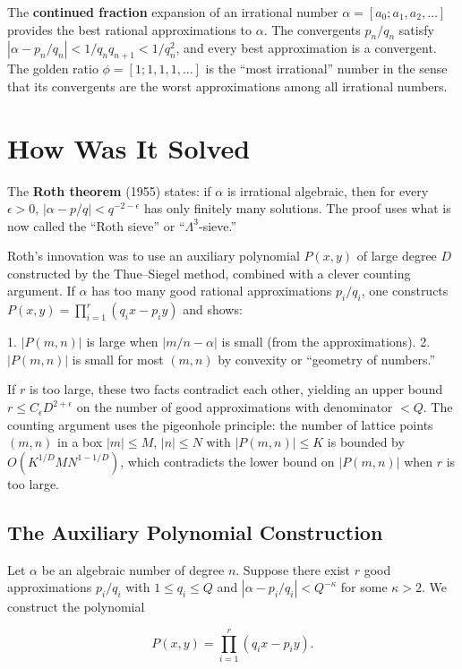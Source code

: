 The \textbf{continued fraction} expansion of an irrational number $\alpha =
[a_0; a_1, a_2, \ldots]$ provides the best rational approximations to $\alpha$.
The convergents $p_n/q_n$ satisfy $|\alpha - p_n/q_n| < 1/q_n q_{n+1} <
1/q_n^2$, and every best approximation is a convergent. The golden ratio
$\phi = [1; 1, 1, 1, \ldots]$ is the ``most irrational'' number in the sense
that its convergents are the worst approximations among all irrational numbers.

\section{How Was It Solved}

The \textbf{Roth theorem} (1955) states: if $\alpha$ is irrational algebraic,
then for every $\epsilon > 0$, $|\alpha - p/q| < q^{-2-\epsilon}$ has only
finitely many solutions. The proof uses what is now called the ``Roth sieve''
or ``$\Lambda^3$-sieve.''

Roth's innovation was to use an auxiliary polynomial $P(x, y)$ of large degree
$D$ constructed by the Thue--Siegel method, combined with a clever counting
argument. If $\alpha$ has too many good rational approximations $p_i/q_i$, one
constructs $P(x,y) = \prod_{i=1}^r (q_i x - p_i y)$ and shows:

1. $|P(m, n)|$ is large when $|m/n - \alpha|$ is small (from the
approximations).
2. $|P(m, n)|$ is small for most $(m,n)$ by convexity or ``geometry of
numbers.''

If $r$ is too large, these two facts contradict each other, yielding an upper
bound $r \leq C_\epsilon D^{2+\epsilon}$ on the number of good approximations
with denominator $< Q$. The counting argument uses the pigeonhole principle:
the number of lattice points $(m,n)$ in a box $|m| \leq M$, $|n| \leq N$ with
$|P(m,n)| \leq K$ is bounded by $O(K^{1/D} MN^{1-1/D})$, which contradicts
the lower bound on $|P(m,n)|$ when $r$ is too large.

\subsection*{The Auxiliary Polynomial Construction}

Let $\alpha$ be an algebraic number of degree $n$. Suppose there exist $r$
good approximations $p_i/q_i$ with $1 \leq q_i \leq Q$ and $|\alpha -
p_i/q_i| < Q^{-\kappa}$ for some $\kappa > 2$. We construct the polynomial

\[P(x,y) = \prod_{i=1}^r (q_i x - p_i y).\]

